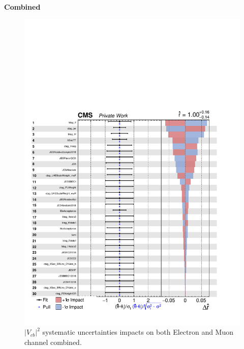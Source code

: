 \pagebreak
\hspace{0pt}
\vfill
\begin{center}
     {\Huge \textbf{Combined}}
\end{center}
\begin{figure}[H]
    \centering
    \includegraphics[width=\linewidth]{fig/chap09-sigback/combined_impact.pdf}
    \caption{$|V_{cb}|^2$ systematic uncertainties impacts on both Electron and Muon channel combined.}
    \label{fig:CombImpact}
\end{figure}

\vfill
\hspace{0pt}
\pagebreak




